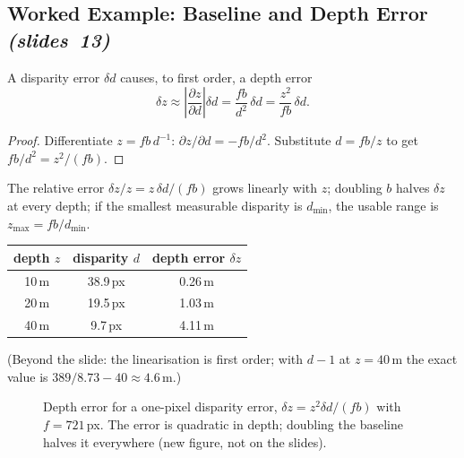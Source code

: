 \documentclass[11pt,a4paper]{article}
\newcommand{\slr}[1]{\texorpdfstring{\emph{(slides~#1)}}{(slides #1)}}
\theoremstyle{definition}
\begin{document}
\subsection{Worked Example: Baseline and Depth Error \slr{13}}
\begin{Theorem}\label{thm:err}
A disparity error $\delta d$ causes, to first order, a depth error
\[ \delta z\approx\left|\frac{\partial z}{\partial d}\right|\delta d=\frac{fb}{d^2}\,\delta d=\frac{z^2}{fb}\,\delta d. \]
\end{Theorem}
\begin{proof}
Differentiate $z=fb\,d^{-1}$: $\partial z/\partial d=-fb/d^2$. Substitute $d=fb/z$ to get $fb/d^2=z^2/(fb)$.
\end{proof}
\begin{Corollary}
The relative error $\delta z/z=z\,\delta d/(fb)$ grows linearly with $z$; doubling $b$ halves $\delta z$ at every depth; if the smallest measurable disparity is $d_{\min}$, the usable range is $z_{\max}=fb/d_{\min}$.
\end{Corollary}
\begin{Example}[Car-like rig, $f\approx721$\,px, $b\approx0.54$\,m, $fb\approx389$\,px$\cdot$m, $\delta d=1$\,px]
\begin{center}\small
\begin{tabular}{@{}ccc@{}}\toprule
depth $z$ & disparity $d$ & depth error $\delta z$\\\midrule
10\,m & 38.9\,px & 0.26\,m\\
20\,m & 19.5\,px & 1.03\,m\\
40\,m & 9.7\,px & 4.11\,m\\\bottomrule
\end{tabular}
\end{center}
(Beyond the slide: the linearisation is first order; with $d-1$ at $z=40$\,m the exact value is $389/8.73-40\approx4.6$\,m.)
\end{Example}
\begin{figure}[H]\centering
{}
\caption{Depth error for a one-pixel disparity error, $\delta z=z^2\delta d/(fb)$ with $f=721$\,px. The error is quadratic in depth; doubling the baseline halves it everywhere (new figure, not on the slides).}
\end{figure}
\end{document}
